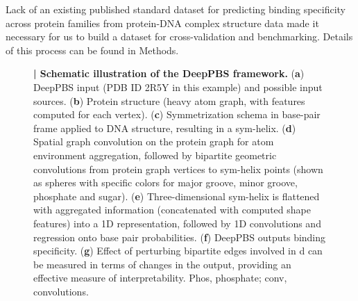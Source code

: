 \par
Lack of an existing published standard dataset for predicting binding specificity across protein families from protein-DNA complex structure data made it necessary for us to build a dataset for cross-validation and benchmarking. Details of this process can be found in Methods.

\begin{center}
    \begin{figure}
        \caption[Schematic illustration of the DeepPBS framework]{\textbf{| Schematic illustration of the DeepPBS framework.} ({\bf a}) DeepPBS input
(PDB ID 2R5Y in this example) and possible input sources. ({\bf b}) Protein structure (heavy atom graph, with features computed for each vertex). ({\bf c}) Symmetrization schema in base-pair frame applied to DNA structure, resulting in a sym-helix. ({\bf d}) Spatial graph convolution on the protein graph for atom environment aggregation, followed by bipartite geometric convolutions from protein graph vertices to sym-helix points (shown as spheres with specific colors for major groove, minor groove, phosphate and sugar). ({\bf e}) Three-dimensional sym-helix is flattened with aggregated information (concatenated with computed shape features) into a 1D representation, followed by 1D convolutions and regression onto base pair probabilities. ({\bf f}) DeepPBS outputs binding specificity. ({\bf g}) Effect of perturbing bipartite edges involved in d can be measured in terms of changes in the output, providing an effective measure of interpretability. Phos, phosphate; conv, convolutions.}
  \label{fig:pdna1}
\end{figure}
\end{center}

